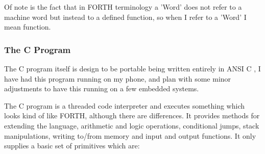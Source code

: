 \documentclass	[a4paper, 10pt]	{article}
\begin{document}
    Of note is the fact that in FORTH terminology a 'Word' does not refer to a machine
    word but instead to a defined function, so when I refer to a 'Word' I mean function.

      \subsubsection{The C Program}

      The C program itself is design to be portable being written entirely in ANSI C \cite{ANSIC}, 
      I have had this program running on my phone, and plan with some minor adjustments
      to have this running on a few embedded systems.

      The C program is a threaded code interpreter and executes something which looks
      kind of like FORTH, although there are differences. It provides methods for
      extending the language, arithmetic and logic operations, conditional jumps,
      stack manipulations, writing to/from memory and input and output functions. It
      only supplies a basic set of primitives which are:
\end{document}

